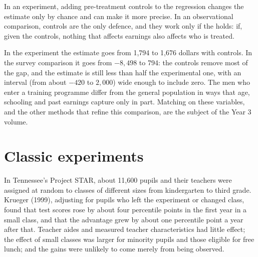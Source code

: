 In an experiment, adding pre-treatment controls to the regression changes the estimate only by chance and can make it
more precise. In an observational comparison, controls are the only defence, and they work only if the  holds: if, given the controls, nothing that affects earnings also affects who is treated.

\label{lst:b2:causality-and-experiments:naive}

\label{out:b2:causality-and-experiments:naive}

\label{lst:b2:causality-and-experiments:adjust}

\label{out:b2:causality-and-experiments:adjust}

In the experiment the estimate goes from 1,794 to 1,676 dollars with controls. In the survey comparison it goes from
$-8{,}498$ to 794: the controls remove most of the gap, and the estimate is still less than half the experimental one,
with an interval (from about $-420$ to $2{,}000$) wide enough to include zero. The men who enter a training programme
differ from the general population in ways that age, schooling and past earnings capture only in part. Matching on these
variables, and the other methods that refine this comparison, are the subject of the Year 3 volume.

\section{Classic experiments}\label{sec:b2:causality-and-experiments:classics}

\begin{record}
In Tennessee's Project STAR, about 11,600 pupils and their teachers were assigned at random to classes of different sizes
from kindergarten to third grade. Krueger (1999), adjusting for pupils who left the experiment or changed class, found that
test scores rose by about four percentile points in the first year in a small class, and that the advantage grew by about
one percentile point a year after that. Teacher aides and measured teacher characteristics had little effect; the effect
of small classes was larger for minority pupils and those eligible for free lunch; and the gains were unlikely to come
merely from being observed.
\end{record}


